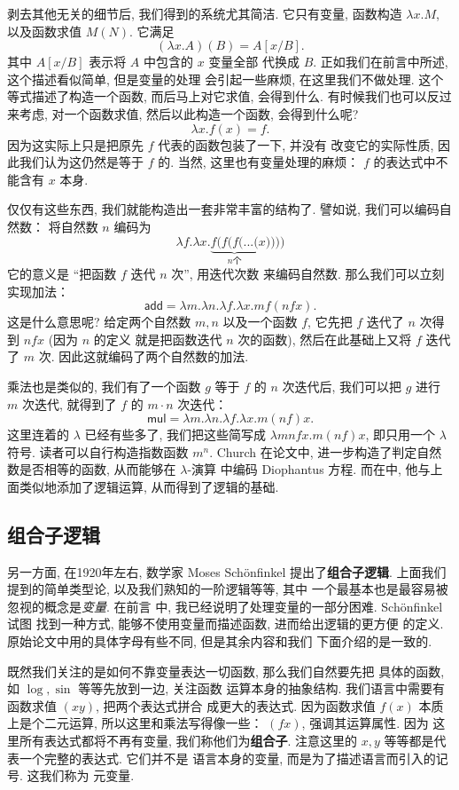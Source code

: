 \documentclass[UTF8]{ctexbook}
\newcommand{\cons}[1]{\textsf{#1}}
\theoremstyle{plain}
\theoremstyle{definition}
\theoremstyle{remark}
\begin{document}
剥去其他无关的细节后, 我们得到的系统尤其简洁. 它只有变量,
函数构造 \(\lambda x. M\), 以及函数求值 \(M(N)\).
它满足
\[(\lambda x. A)(B) = A[x/B].\]
其中 \(A[x/B]\) 表示将 \(A\) 中包含的 \(x\) 变量全部
代换成 \(B\). 正如我们在前言中所述, 这个描述看似简单, 但是变量的处理
会引起一些麻烦, 在这里我们不做处理. 这个等式描述了构造一个函数,
而后马上对它求值, 会得到什么. 有时候我们也可以反过来考虑,
对一个函数求值, 然后以此构造一个函数, 会得到什么呢?
\[\lambda x. f(x) = f.\]
因为这实际上只是把原先 \(f\) 代表的函数包装了一下, 并没有
改变它的实际性质, 因此我们认为这仍然是等于 \(f\) 的.
当然, 这里也有变量处理的麻烦： \(f\) 的表达式中不能含有 \(x\) 本身.

仅仅有这些东西, 我们就能构造出一套非常丰富的结构了. 譬如说,
我们可以编码自然数： 将自然数 \(n\) 编码为
\[\lambda f. \lambda x. \underbrace{f(f(f(...(}_{n\text{个}}x))))\]
它的意义是 “把函数 \(f\) 迭代 \(n\) 次”, 用迭代次数
来编码自然数. 那么我们可以立刻实现加法：
\[\cons{add} = \lambda m. \lambda n. \lambda f. \lambda x. mf(nfx).\]
这是什么意思呢? 给定两个自然数 \(m, n\) 以及一个函数 \(f\),
它先把 \(f\) 迭代了 \(n\) 次得到 \(nfx\) (因为 \(n\) 的定义
就是把函数迭代 \(n\) 次的函数), 然后在此基础上又将
\(f\) 迭代了 \(m\) 次. 因此这就编码了两个自然数的加法.

乘法也是类似的, 我们有了一个函数 \(g\) 等于 \(f\) 的 \(n\)
次迭代后, 我们可以把 \(g\) 进行 \(m\) 次迭代, 就得到了
\(f\) 的 \(m\cdot n\) 次迭代：
\[\cons{mul} = \lambda m. \lambda n. \lambda f. \lambda x. m(nf)x.\]
这里连着的 \(\lambda\) 已经有些多了, 我们把这些简写成
\(\lambda mnfx. m(nf)x\), 即只用一个 \(\lambda\) 符号.
读者可以自行构造指数函数 \(m^n\). Church 在论文\cite{church:1936:lambda}中,
进一步构造了判定自然数是否相等的函数, 从而能够在 \(\lambda\)-演算
中编码 Diophantus 方程. 而在\cite{church:1932:untyped}中,
他与上面类似地添加了逻辑运算, 从而得到了逻辑的基础.

\subsection{组合子逻辑}
另一方面, 在1920年左右, 数学家 Moses Sch\"onfinkel 提出了\textbf{组合子逻辑}\cite{schonfinkel:1924:combinator}.
上面我们提到的简单类型论, 以及我们熟知的一阶逻辑等等, 其中
一个最基本也是最容易被忽视的概念是\emph{变量}. 在前言
中, 我已经说明了处理变量的一部分困难. Sch\"onfinkel 试图
找到一种方式, 能够不使用变量而描述函数, 进而给出逻辑的更方便
的定义. 原始论文中用的具体字母有些不同, 但是其余内容和我们
下面介绍的是一致的.

既然我们关注的是如何不靠变量表达一切函数, 那么我们自然要先把
具体的函数, 如 \(\log, \sin\) 等等先放到一边, 关注函数
运算本身的抽象结构. 我们语言中需要有函数求值 \((xy)\), 把两个表达式拼合
成更大的表达式. 因为函数求值 \(f(x)\) 本质上是个二元运算,
所以这里和乘法写得像一些： \((fx)\), 强调其运算属性. 因为
这里所有表达式都将不再有变量, 我们称他们为\textbf{组合子}.
注意这里的 \(x,y\) 等等都是代表一个完整的表达式. 它们并不是
语言本身的变量, 而是为了描述语言而引入的记号. 这我们称为
元变量.
\end{document}
